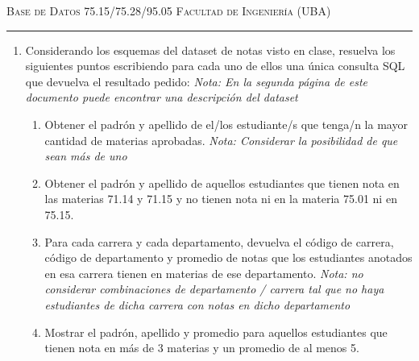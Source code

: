 \documentclass[12pt]{amsart}
\begin{document}
\thispagestyle{empty}

{\scshape Base de Datos 75.15/75.28/95.05} \hfill {\scshape Facultad de Ingenierí­a (UBA)} \hfill

\smallskip

\hrule

\bigskip


\vspace{0.5cm}
\begin{enumerate}

\item Considerando los esquemas del dataset de notas visto en clase, resuelva los siguientes puntos escribiendo para cada uno de ellos una única consulta SQL que devuelva el resultado pedido:
\newline 
\textit{\emph{Nota:} En la segunda página de este documento puede encontrar una descripción del dataset}

\vspace{0.5cm}

\begin{enumerate}[label = \textit{\alph*)}]

\item Obtener el padrón y apellido de el/los estudiante/s que tenga/n la mayor cantidad de materias aprobadas. \newline
\textit{\emph{Nota:} Considerar la posibilidad de que sean más de uno}


\vspace{0.5cm}

\item Obtener el padrón y apellido de aquellos estudiantes que tienen nota en las materias 71.14 y 71.15 y no tienen nota ni en la materia 75.01 ni en 75.15.

\vspace{0.5cm}

\item Para cada carrera y cada departamento, devuelva el código de carrera, código de departamento y promedio de notas que los estudiantes anotados en esa carrera tienen en materias de ese departamento. 
\newline
\textit{\emph{Nota:} no considerar combinaciones de departamento / carrera tal que no haya estudiantes de dicha carrera con notas en dicho departamento}

\vspace{0.5cm}

\item Mostrar el padrón, apellido y promedio para aquellos estudiantes que tienen nota en más de 3 materias y un promedio de al menos 5.


\end{enumerate}
\end{enumerate}
\end{document}
